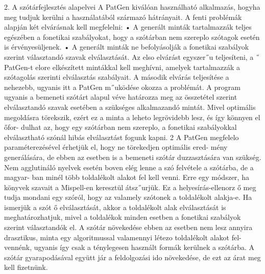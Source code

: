 \documentclass[11pt]{beamer}
\begin{document}
    \begin{frame}
        2. A szótárfejlesztés alapelvei
        A PatGen kiválóan használható alkalmazás, hogyha meg tudjuk kerülni a használatából
        származó hátrányait. A fenti problémák alapján két elvárásnak kell megfelelni:
        • A generált minták tartalmazzák teljes egészében a fonetikai szabályokat, hogy a szótárban nem szereplo szótagok esetén is érvényesüljenek.
        • A generált minták ne befolyásolják a fonetikai szabályok szerint választandó szavak
        elválasztását.
        Az elso elvárást egyszer˝u teljesíteni, a ˝ PatGen-t elore elkészített mintákkal kell meghívni,
        amelyek tartalmazzák a szótagolás szerinti elválasztás szabályait.
        A második elvárás teljesítése a nehezebb, ugyanis itt a PatGen m˝uködése okozza a
        problémát. A program ugyanis a bemeneti szótárt alapul véve határozza meg az összetétel
        szerint elválasztandó szavak esetében a szükséges alkalmazandó mintát. Mivel optimális
        megoldásra törekszik, ezért ez a minta a leheto legrövidebb lesz, és így könnyen el őfor-
        dulhat az, hogy egy szótárban nem szereplo, a fonetikai szabályokkal elválasztható szónál
        hibás elválasztást fogunk kapni.
        2
        A PatGen megfelelo paraméterezésével érhetjük el, hogy ne törekedjen optimális ered-
        mény generálására, de ebben az esetben is a bemeneti szótár duzzasztására van szükség.
        Nem agglutináló nyelvek esetén boven elég lenne a szó felvétele a szótárba, de a magyar-
        ban minél több toldalékolt alakot fel kell venni. Erre egy módszer, ha könyvek szavait a
        Mispell-en keresztül átsz˝urjük. Ez a helyesírás-ellenorz ő meg tudja mondani egy szóról,
        hogy az valamely szótonek a toldalékolt alakja-e. Ha ismerjük a szót ő elválasztását, akkor
        a toldalékolt alak elválasztását is meghatározhatjuk, mivel a toldalékok minden esetben a
        fonetikai szabályok szerint választandók el. A szótár növekedése ebben az esetben nem
        lesz annyira drasztikus, minta egy algoritmussal valamennyi létezo toldalékolt alakot fel-
        vennénk, ugyanis így csak a ténylegesen használt formák kerülnek a szótárba.
        A szótár gyarapodásával együtt jár a feldolgozási ido növekedése, de ezt az árat meg
        kell fizetnünk.
    \end{frame}
\end{document}
